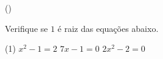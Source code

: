 \begin{question}[type=exam] () %

Verifique se $1$ é raiz das equações abaixo.


\begin{tasks}(1)
        \task $x^2-1=2$
        \task $7x-1=0$
        \task $2x^2-2=0$   
    \end{tasks}
\end{question}


   